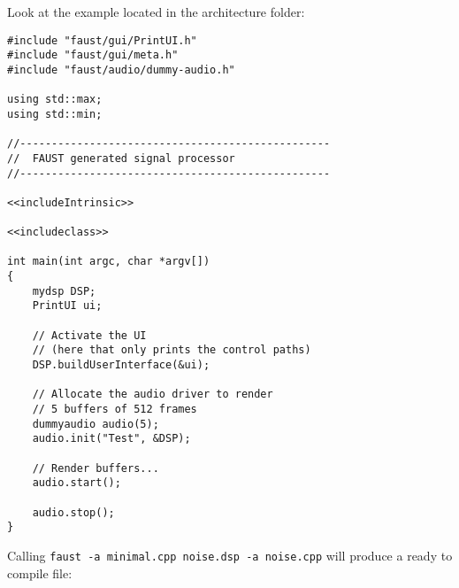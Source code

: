 Look at the  example located in the architecture folder:

\begin{lstlisting}[basicstyle=\ttfamily\footnotesize\color{yotxt}]
#include "faust/gui/PrintUI.h"
#include "faust/gui/meta.h"
#include "faust/audio/dummy-audio.h"

using std::max;
using std::min;

//-------------------------------------------------
//  FAUST generated signal processor
//-------------------------------------------------

<<includeIntrinsic>>

<<includeclass>>

int main(int argc, char *argv[])
{
    mydsp DSP;
    PrintUI ui;
    
    // Activate the UI
    // (here that only prints the control paths)
    DSP.buildUserInterface(&ui);

    // Allocate the audio driver to render 
    // 5 buffers of 512 frames
    dummyaudio audio(5);
    audio.init("Test", &DSP);
    
    // Render buffers...
    audio.start();
    
    audio.stop();
}
\end{lstlisting} 

Calling \lstinline'faust -a minimal.cpp noise.dsp -a noise.cpp' will produce a ready to compile   file:

